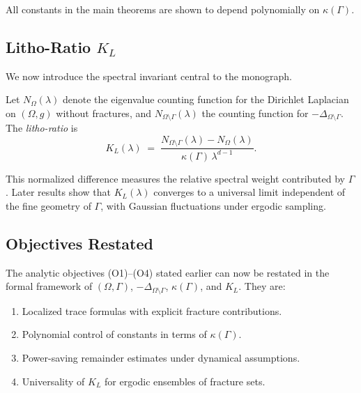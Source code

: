 All constants in the main theorems are shown to depend polynomially on
$\kappa(\Gamma)$.

\subsection{Litho-Ratio $K_L$}

We now introduce the spectral invariant central to the monograph.

\begin{definition}
Let $N_\Omega(\lambda)$ denote the eigenvalue counting function for the
Dirichlet Laplacian on $(\Omega,g)$ without fractures, and
$N_{\Omega\setminus\Gamma}(\lambda)$ the counting function for
$-\Delta_{\Omega\setminus\Gamma}$. The \emph{litho-ratio} is
\[
K_L(\lambda) \;=\;
\frac{N_{\Omega\setminus\Gamma}(\lambda) - N_\Omega(\lambda)}
{\kappa(\Gamma)\,\lambda^{d-1}}.
\]
\end{definition}

This normalized difference measures the relative spectral weight contributed
by $\Gamma$. Later results show that $K_L(\lambda)$ converges to a universal
limit independent of the fine geometry of $\Gamma$, with Gaussian fluctuations
under ergodic sampling.

\subsection{Objectives Restated}

The analytic objectives (O1)--(O4) stated earlier can now be restated in the
formal framework of $(\Omega,\Gamma)$, $-\Delta_{\Omega\setminus\Gamma}$,
$\kappa(\Gamma)$, and $K_L$. They are:

\begin{enumerate}[label=\textbf{O\arabic*.}]
  \item Localized trace formulas with explicit fracture contributions.
  \item Polynomial control of constants in terms of $\kappa(\Gamma)$.
  \item Power-saving remainder estimates under dynamical assumptions.
  \item Universality of $K_L$ for ergodic ensembles of fracture sets.
\end{enumerate}

